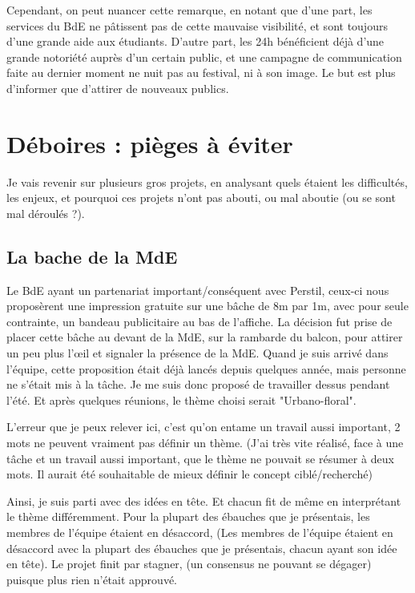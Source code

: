     Cependant, on peut nuancer cette remarque, en notant que d'une part, les services du BdE ne pâtissent pas de cette mauvaise visibilité, et sont toujours d'une grande aide aux étudiants. D'autre part, les 24h bénéficient déjà d'une grande notoriété auprès d'un certain public, et une campagne de communication faite au dernier moment ne nuit pas au festival, ni à son image. Le but est plus d'informer que d'attirer de nouveaux publics.
    
\section{Déboires : pièges à éviter}

    Je vais revenir sur plusieurs gros projets, en analysant quels étaient les difficultés, les enjeux, et pourquoi ces projets n'ont pas abouti, ou mal aboutie (ou se sont mal déroulés ?).
    
    \subsection{La bache de la MdE}
    
        Le BdE ayant un partenariat important/conséquent avec Perstil, ceux-ci nous proposèrent une impression gratuite sur une bâche de 8m par 1m, avec pour seule contrainte, un bandeau publicitaire au bas de l'affiche. 
        La décision fut prise de placer cette bâche au devant de la MdE, sur la rambarde du balcon, pour attirer un peu plus l'œil et signaler la présence de la MdE.
        Quand je suis arrivé dans l'équipe, cette proposition était déjà lancés depuis quelques année, mais personne ne s'était mis à la tâche.
        Je me suis donc proposé de travailler dessus pendant l'été. Et après quelques réunions, le thème choisi serait "Urbano-floral".
        
        L'erreur que je peux relever ici, c'est qu'on entame un travail aussi important, 2 mots ne peuvent vraiment pas définir un thème. (J'ai très vite réalisé, face à une tâche et un travail aussi important, que le thème ne pouvait se résumer à deux mots. Il aurait été souhaitable de mieux définir le concept ciblé/recherché)
        
        Ainsi, je suis parti avec des idées en tête. Et chacun fit de même en interprétant le thème différemment.
        Pour la plupart des ébauches que je présentais, les membres de l'équipe étaient en désaccord, (Les membres de l'équipe étaient en désaccord avec la plupart des ébauches que je présentais, chacun ayant son idée en tête). Le projet finit par stagner, (un consensus ne pouvant se dégager) puisque plus rien n'était approuvé.
        
